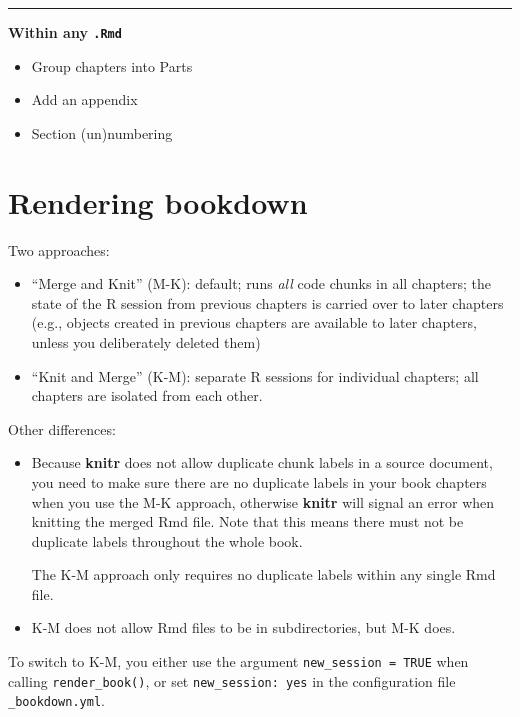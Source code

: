 \documentclass[
]{book}
\providecommand{\tightlist}{%
  \setlength{\itemsep}{0pt}\setlength{\parskip}{0pt}}
\theoremstyle{definition}
\theoremstyle{definition}
\theoremstyle{definition}
\theoremstyle{definition}
\theoremstyle{remark}
\begin{document}
\begin{center}\rule{0.5\linewidth}{0.5pt}\end{center}

\textbf{Within any \texttt{.Rmd}}

\begin{itemize}
\tightlist
\item
  Group chapters into Parts
\item
  Add an appendix
\item
  Section (un)numbering
\end{itemize}

\section{Rendering bookdown}\label{rendering-bookdown}

Two approaches:

\begin{itemize}
\tightlist
\item
  ``Merge and Knit'' (M-K): default; runs \emph{all} code chunks in all chapters; the state of the R session from previous chapters is carried over to later chapters (e.g., objects created in previous chapters are available to later chapters, unless you deliberately deleted them)
\item
  ``Knit and Merge'' (K-M): separate R sessions for individual chapters; all chapters are isolated from each other.
\end{itemize}

Other differences:

\begin{itemize}
\item
  Because \textbf{knitr} does not allow duplicate chunk labels in a source document, you need to make sure there are no duplicate labels in your book chapters when you use the M-K approach, otherwise \textbf{knitr} will signal an error when knitting the merged Rmd file. Note that this means there must not be duplicate labels throughout the whole book.

  The K-M approach only requires no duplicate labels within any single Rmd file.
\item
  K-M does not allow Rmd files to be in subdirectories, but M-K does.
\end{itemize}

To switch to K-M, you either use the argument \texttt{new\_session\ =\ TRUE} when calling \texttt{render\_book()}, or set \texttt{new\_session:\ yes} in the configuration file \texttt{\_bookdown.yml}.
\end{document}
